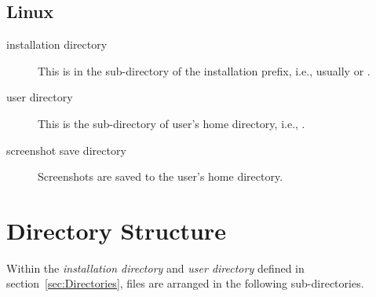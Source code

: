 \subsection{Linux}
\label{sec:FilesAndDirectories:Linux}

\begin{description}
\item[installation directory] This is in the
   sub-directory of the installation prefix,
  i.e., usually  or
  .
\item[user directory] This is the  sub-directory
  of user's home directory, i.e., .
\item[screenshot save directory] Screenshots are saved to the user's
  home directory.
\end{description}

\section{Directory Structure}
\label{sec:FilesAndDirectories:DirectoryStructure}

Within the \emph{installation directory} and \emph{user directory}
defined in section~\ref{sec:Directories}, files are arranged in the
following sub-directories.

